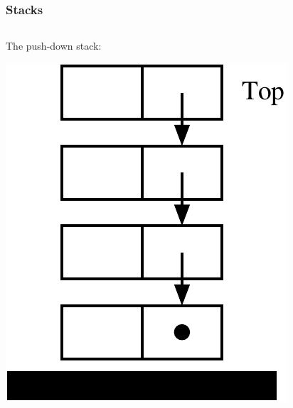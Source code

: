 \begin{frame}[fragile]
\frametitle{Stacks}
\begin{columns}[T]

\begin{column}{0.45\textwidth}
\begin{center}
The push-down stack:

\includegraphics[scale=0.40]{../Images/stack.pdf}
\end{center}
\end{column}


\end{columns}
\end{frame}
